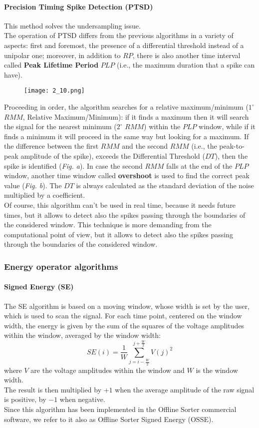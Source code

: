 \paragraph{Precision Timing Spike Detection (PTSD)}
This method solves the undersampling issue. \\ The operation of PTSD differs from the previous
algorithms in a variety of aspects: first and foremost, the presence of a differential threshold
instead of a unipolar one; moreover, in addition to \(RP\), there is also another time interval
called \textbf{Peak Lifetime Period} \(PLP\) (i.e., the maximum duration that a spike can have).
\begin{figure}[H]
    \centering
    \texttt{[image: 2\_10.png]}
\end{figure}
Proceeding in order, the algorithm searches for a relative maximum/minimum (\(1^\circ\) \(RMM\),
Relative Maximum/Minimum): if it finds a maximum then it will search the signal for
the nearest minimum (\(2^\circ\) \(RMM\)) within the \(PLP\) window, while if it finds a minimum it will proceed
in the same way but looking for a maximum. If the difference between the first \(RMM\) and the second \(RMM\)
(i.e., the peak-to-peak amplitude of the spike), exceeds the Differential Threshold (\(DT\)),
then the spike is identified (\textit{Fig. a}). In case the second \(RMM\) falls at the end of the \(PLP\) window,
another time window called \textbf{overshoot} is used to find the correct peak value (\textit{Fig. b}). The \(DT\) is
always calculated as the standard deviation of the noise multiplied by a coefficient.\\
Of course, this algorithm can't be used in real time, because it needs future times, but it allows to detect also the
spikes passing through the boundaries of the considered window.
This technique is more demanding from the computational point of view, but it allows to detect
also the spikes passing through the boundaries of the considered window.
\subsubsection{Energy operator algorithms}
\paragraph{Signed Energy (SE)}
The SE algorithm is based on a moving window, whose width is set by the user,
which is used to scan the signal. For each time point, centered on the window width,
the energy is given by the sum of the squares of the voltage amplitudes within the
window, averaged by the window width:
\begin{equation*}
    SE(i)=\frac{1}{W}\sum_{j=i-\frac{W}{2}}^{j+\frac{W}{2}}V(j)^2
\end{equation*}
where \(V\) are the voltage amplitudes within the window and \(W\) is the window width.\\
The result is then multiplied by \(+1\) when the average amplitude of the raw signal is positive,
by \(-1\) when negative.\\
Since this algorithm has been implemented in the Offline Sorter commercial software,
we refer to it also as Offline Sorter Signed Energy (OSSE).
